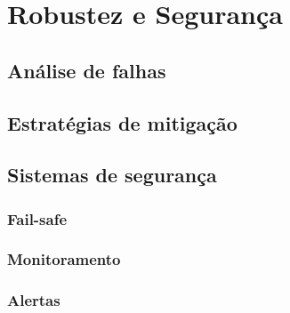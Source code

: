 \section{Robustez e Segurança}
\subsection{Análise de falhas}
\subsection{Estratégias de mitigação}
\subsection{Sistemas de segurança}
\subsubsection{Fail-safe}
\subsubsection{Monitoramento}
\subsubsection{Alertas}